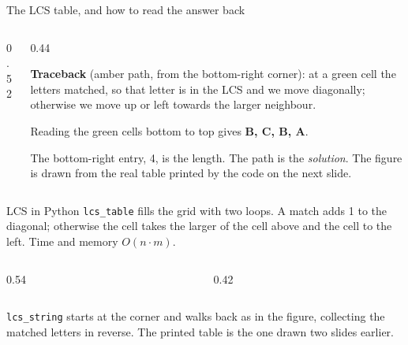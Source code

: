 \documentclass[aspectratio=169,10pt]{beamer}
\newcommand{\figtab}[2][0.5]{\begin{sfig}[#1]\end{sfig}}
\begin{document}
\begin{frame}{The LCS table, and how to read the answer back}
\begin{columns}[T]
\begin{column}{0.52\textwidth}
\figtab[0.78]{fig_lcs2}
\end{column}
\begin{column}{0.44\textwidth}
{\small
\textbf{Traceback} (amber path, from the bottom-right corner): at a \colorbox{tdGreen!40}{green} cell the letters matched, so that letter is in the LCS and we move diagonally; otherwise we move up or left towards the larger neighbour.

\vspace{2mm}
Reading the green cells bottom to top gives \textbf{B, C, B, A}.

\vspace{2mm}
The bottom-right entry, 4, is the length. The path is the \emph{solution}. The figure is drawn from the real table printed by the code on the next slide.}
\end{column}
\end{columns}
\end{frame}

\begin{frame}[allowframebreaks]{LCS in Python}
\vspace{2mm}
{\small
\texttt{lcs\_table} fills the grid with two loops. A match adds 1 to the diagonal; otherwise the cell takes the larger of the cell above and the cell to the left. Time and memory $O(n\cdot m)$.}
\framebreak
\begin{columns}[T]
\begin{column}{0.54\textwidth}
\end{column}
\begin{column}{0.42\textwidth}
\end{column}
\end{columns}
\vspace{1mm}
{\small
\texttt{lcs\_string} starts at the corner and walks back as in the figure, collecting the matched letters in reverse. The printed table is the one drawn two slides earlier.}
\end{frame}
\end{document}
